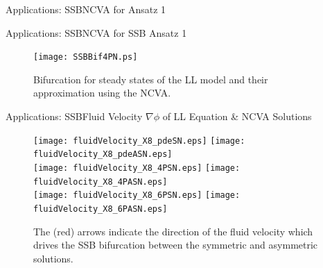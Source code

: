 \begin{frame}[c]{Applications: SSB}{NCVA for \textcolor{paleblue}{Ansatz 1} }
\begin{alertblock}{}
\end{alertblock}
\end{frame}


\begin{frame}[c]{Applications: SSB}{NCVA for SSB \textcolor{paleblue}{Ansatz 1}}
\vspace{-1em}
\begin{figure}[h]
\centering
\texttt{[image: SSBBif4PN.ps]}
\caption{Bifurcation for steady states of the LL model and their approximation using the NCVA.}
\end{figure}
\end{frame}

\begin{frame}[c]{Applications: SSB}{Fluid Velocity $\nabla \phi$ of LL Equation \& NCVA Solutions}
\begin{figure}[h]
\centering
\texttt{[image: fluidVelocity\_X8\_pdeSN.eps]} \quad
\texttt{[image: fluidVelocity\_X8\_pdeASN.eps]} 
\\
\texttt{[image: fluidVelocity\_X8\_4PSN.eps]} \quad
\texttt{[image: fluidVelocity\_X8\_4PASN.eps]} 
\\
\texttt{[image: fluidVelocity\_X8\_6PSN.eps]} \quad
\texttt{[image: fluidVelocity\_X8\_6PASN.eps]}
\caption{The (red) arrows indicate the direction of the fluid velocity which drives 
the SSB bifurcation between the symmetric and asymmetric solutions.}
\end{figure}
\end{frame}

